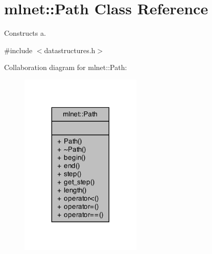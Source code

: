 \hypertarget{classmlnet_1_1_path}{\section{mlnet\+:\+:Path Class Reference}
\label{classmlnet_1_1_path}
}


Constructs a.  




{\ttfamily \#include $<$datastructures.\+h$>$}



Collaboration diagram for mlnet\+:\+:Path\+:\nopagebreak
\begin{figure}[H]
\begin{center}
\leavevmode
\includegraphics[width=164pt]{classmlnet_1_1_path__coll__graph}
\end{center}
\end{figure}
